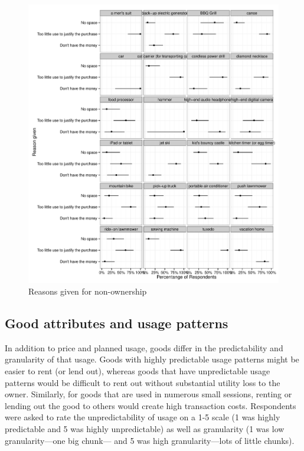 \documentclass[11pt]{article}
\begin{document}
\begin{figure}
\centering 
\caption{Reasons given for non-ownership} 
\label{fig:reasons}
\begin{minipage}{0.90 \linewidth}
\includegraphics[width = \linewidth]{./plots/reasons.pdf} 
\end{minipage} 
\end{figure} 

\subsection{Good attributes and usage patterns} 
In addition to price and planned usage, goods differ in the predictability and granularity of that usage.
Goods with highly predictable usage patterns might be easier to rent (or lend out), whereas goods that have unpredictable usage patterns would be difficult to rent out without substantial utility loss to the owner.
Similarly, for goods that are used in numerous small sessions, renting
or lending out the good to others would create high transaction costs.
Respondents were asked to rate the unpredictability of usage on a 1-5 scale (1 was highly predictable and 5 was highly unpredictable) as well as granularity (1 was low granularity---one big chunk--- and 5 was high granularity---lots of little chunks).  
\end{document}
